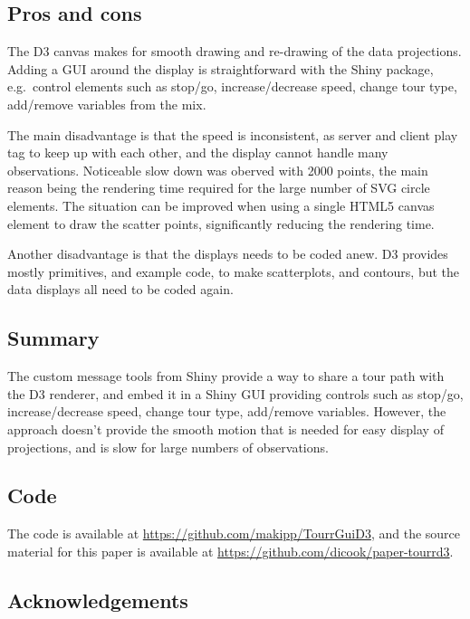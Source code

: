 \hypertarget{pros-and-cons}{%
\subsection{Pros and cons}\label{pros-and-cons}}

The D3 canvas makes for smooth drawing and re-drawing of the data
projections. Adding a GUI around the display is straightforward with the
Shiny package, e.g.~control elements such as stop/go, increase/decrease
speed, change tour type, add/remove variables from the mix.

The main disadvantage is that the speed is inconsistent, as server and
client play tag to keep up with each other, and the display cannot
handle many observations. Noticeable slow down was oberved with 2000
points, the main reason being the rendering time required for the large
number of SVG circle elements. The situation can be improved when using
a single HTML5 canvas element to draw the scatter points, significantly
reducing the rendering time.

Another disadvantage is that the displays needs to be coded anew. D3
provides mostly primitives, and example code, to make scatterplots, and
contours, but the data displays all need to be coded again.

\hypertarget{summary}{%
\subsection{Summary}\label{summary}}

The custom message tools from Shiny provide a way to share a tour path
with the D3 renderer, and embed it in a Shiny GUI providing controls
such as stop/go, increase/decrease speed, change tour type, add/remove
variables. However, the approach doesn't provide the smooth motion that
is needed for easy display of projections, and is slow for large numbers
of observations.

\hypertarget{code}{%
\subsection{Code}\label{code}}

The code is available at \url{https://github.com/makipp/TourrGuiD3}, and
the source material for this paper is available at
\url{https://github.com/dicook/paper-tourrd3}.

\hypertarget{acknowledgements}{%
\subsection{Acknowledgements}\label{acknowledgements}}

